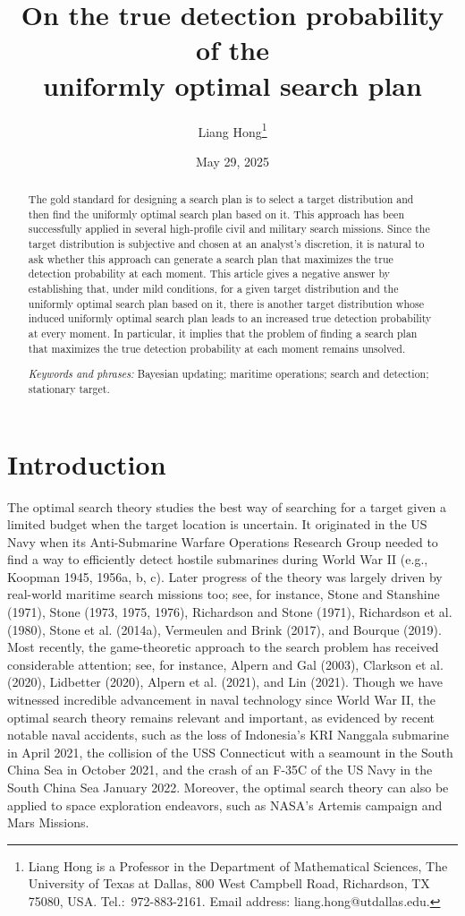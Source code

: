 \documentclass[12pt]{article}
\title{On the true detection probability of the \\
uniformly optimal search plan}
\author{Liang Hong\footnote{Liang Hong is a Professor in the Department of Mathematical Sciences,  The University of Texas at Dallas, 800 West Campbell Road, Richardson, TX 75080, USA. Tel.:~972-883-2161. Email address: liang.hong@utdallas.edu.}}
\date{May 29, 2025}
\theoremstyle{plain}
\theoremstyle{definition}
\theoremstyle{remark}
\begin{document}
\maketitle



\begin{abstract}
The gold standard for designing a search plan is to select a target distribution and then find the uniformly optimal search plan based on it.  This approach has been successfully applied in several high-profile civil and military search missions.  Since the target distribution is subjective and chosen at an analyst's discretion,  it is natural to ask whether this approach can generate a search plan that maximizes the true detection probability at each moment.  This article gives a negative answer by establishing that, under mild conditions,  for a given target distribution and the uniformly optimal search plan based on it, there is another target distribution whose induced uniformly optimal search plan leads to an increased true detection probability at every moment.  In particular, it implies that the problem of finding a search plan that maximizes the true detection probability at each moment remains unsolved. 

\smallskip

\emph{Keywords and phrases:} Bayesian updating; maritime operations; search and detection;  stationary target.
\end{abstract}


%
\section{Introduction}
The optimal search theory studies the best way of searching for a target given a limited budget when the target location is uncertain.  It originated in the US Navy when its Anti-Submarine Warfare Operations Research Group needed to find a way to efficiently detect hostile submarines during World War II (e.g., Koopman 1945, 1956a, b, c).   Later progress of the theory was largely driven by real-world maritime search missions too; see, for instance, Stone and Stanshine (1971), Stone (1973, 1975, 1976), Richardson and Stone (1971),   Richardson et al. (1980),  Stone et al. (2014a),  Vermeulen and Brink (2017), and Bourque (2019).  Most recently, the game-theoretic approach to the search problem has received considerable attention; see, for instance,  Alpern and Gal (2003),   Clarkson et al. (2020),  Lidbetter (2020),  Alpern et al. (2021),  and Lin (2021).  Though we have witnessed incredible advancement in naval technology since World War II,  the optimal search theory remains relevant and important,  as evidenced by recent notable naval accidents, such as the loss of Indonesia's KRI Nanggala submarine in April 2021,  the collision of the USS Connecticut with a seamount in the South China Sea in October 2021,  and the crash of an F-35C of the US Navy in the South China Sea January 2022.  Moreover,  the optimal search theory can also be applied to space exploration endeavors, such as NASA's Artemis campaign and Mars Missions. 
\end{document}
